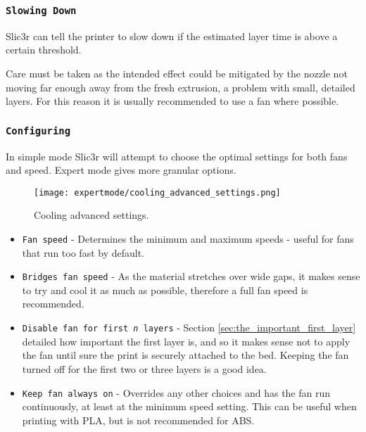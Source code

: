 
\subsubsection{\texttt{Slowing Down}} %
\label{sub:slowing_down}
Slic3r can tell the printer to slow down if the estimated layer time is above a certain threshold.

Care must be taken as the intended effect could be mitigated by the nozzle not moving far enough away from the fresh extrusion, a problem with small, detailed layers.  For this reason it is usually recommended to use a fan where possible.

\subsubsection{\texttt{Configuring}} %
\label{sub:configuring_cooling}

In simple mode Slic3r will attempt to choose the optimal settings for both fans and speed.  Expert mode gives more granular options.

\begin{figure}[H]
\centering
\texttt{[image: expertmode/cooling\_advanced\_settings.png]}
\caption{Cooling advanced settings.}
\label{fig:cooling_advanced_settings}
\end{figure}

\begin{itemize}
	\item \texttt{Fan speed}  - Determines the minimum and maximum speeds - useful for fans that run too fast by default.
	\item \texttt{Bridges fan speed}  - As the material stretches over wide gaps, it makes sense to try and cool it as much as possible, therefore a full fan speed is recommended.
	\item \texttt{Disable fan for first \textit{n} layers}  - Section \ref{sec:the_important_first_layer} detailed how important the first layer is, and so it makes sense not to apply the fan until sure the print is securely attached to the bed.  Keeping the fan turned off for the first two or three layers is a good idea.
	\item \texttt{Keep fan always on}  - Overrides any other choices and has the fan run continuously, at least at the minimum speed setting.  This can be useful when printing with PLA, but is not recommended for ABS.
\end{itemize}

